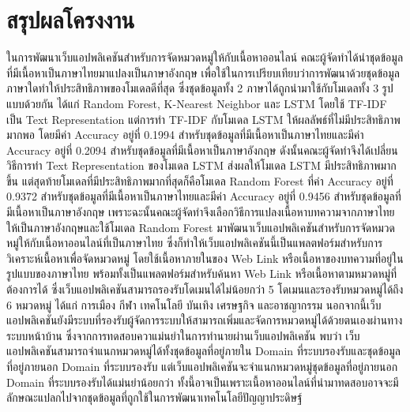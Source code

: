 \documentclass[12pt,oneside,openright,a4paper]{cpe-thai-project}
\begin{document}
\section{สรุปผลโครงงาน}
\hspace{1cm}ในการพัฒนาเว็บแอปพลิเคชันสำหรับการจัดหมวดหมู่ให้กับเนื้อหาออนไลน์ คณะผู้จัดทำได้นำชุดข้อมูลที่มีเนื้อหาเป็นภาษาไทยมาแปลงเป็นภาษาอังกฤษ
เพื่อใช้ในการเปรียบเทียบว่าการพัฒนาด้วยชุดข้อมูลภาษาใดทำให้ประสิทธิภาพของโมเดลดีที่สุด ซึ่งชุดข้อมูลทั้ง 2 ภาษาได้ถูกนำมาใช้กับโมเดลทั้ง 3 รูปแบบด้วยกัน ได้แก่
Random Forest, K-Nearest Neighbor และ LSTM โดยใช้ TF-IDF เป็น Text Representation แต่การทำ TF-IDF กับโมเดล LSTM ให้ผลลัพธ์ที่ไม่มีประสิทธิภาพมากพอ
โดยมีค่า Accuracy อยู่ที่ 0.1994 สำหรับชุดข้อมูลที่มีเนื้อหาเป็นภาษาไทยและมีค่า Accuracy อยู่ที่ 0.2094 สำหรับชุดข้อมูลที่มีเนื้อหาเป็นภาษาอังกฤษ 
ดังนั้นคณะผู้จัดทำจึงได้เปลี่ยนวิธีการทำ Text Representation ของโมเดล LSTM ส่งผลให้โมเดล LSTM มีประสิทธิภาพมากขึ้น แต่สุดท้ายโมเดลที่มีประสิทธิภาพมากที่สุดก็คือโมเดล
Random Forest ที่ค่า Accuracy อยู่ที่ 0.9372 สำหรับชุดข้อมูลที่มีเนื้อหาเป็นภาษาไทยและมีค่า Accuracy อยู่ที่ 0.9456 สำหรับชุดข้อมูลที่มีเนื้อหาเป็นภาษาอังกฤษ
เพราะฉะนั้นคณะผู้จัดทำจึงเลือกวิธีการแปลงเนื้อหาบทความจากภาษาไทยให้เป็นภาษาอังกฤษและใช้โมเดล Random Forest 
มาพัฒนาเว็บแอปพลิเคชันสําหรับการจัดหมวดหมู่ให้กับเนื้อหาออนไลน์ที่เป็นภาษาไทย ซึ่งก็ทำให้เว็บแอปพลิเคชันนี้เป็นแพลตฟอร์มสําหรับการวิเคราะห์เนื้อหาเพื่อจัดหมวดหมู่ 
โดยใช้เนื้อหาภายในของ Web Link หรือเนื้อหาของบทความที่อยู่ในรูปแบบของภาษาไทย พร้อมทั้งเป็นแพลตฟอร์มสําหรับค้นหา Web Link หรือเนื้อหาตามหมวดหมู่ที่ต้องการได้
ซึ่งเว็บแอปพลิเคชันสามารถรองรับโดเมนได้ไม่น้อยกว่า 5 โดเมนและรองรับหมวดหมู่ได้ถึง 6 หมวดหมู่ ได้แก่ การเมือง กีฬา เทคโนโลยี บันเทิง เศรษฐกิจ และอาชญากรรม
นอกจากนี้เว็บแอปพลิเคชันยังมีระบบที่รองรับผู้จัดการระบบให้สามารถเพิ่มและจัดการหมวดหมู่ได้ด้วยตนเองผ่านทางระบบหน้าบ้าน ซึ่งจากการทดสอบควาแม่นยำในการทำนายผ่านเว็บแอปพลิเคชัน
พบว่า เว็บแอปพลิเคชันสามารถจำแนกหมวดหมู่ได้ทั้งชุดข้อมูลที่อยู่ภายใน Domain ที่ระบบรองรับและชุดข้อมูลที่อยู่ภายนอก Domain ที่ระบบรองรับ 
แต่เว็บแอปพลิเคชันจะจำแนกหมวดหมู่ชุดข้อมูลที่อยู่ภายนอก Domain ที่ระบบรองรับได้แม่นยำน้อยกว่า 
ทั้งนี้อาจเป็นเพราะเนื้อหาออนไลน์ที่นำมาทดสอบอาจจะมีลักษณะแปลกไปจากชุดข้อมูลที่ถูกใช้ในการพัฒนาเทคโนโลยีปัญญาประดิษฐ์
\end{document}
